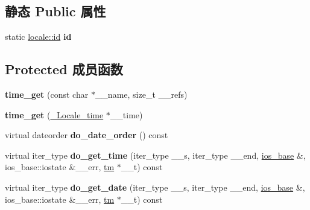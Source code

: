 \subsection*{静态 Public 属性}
\begin{DoxyCompactItemize}
\item 
\mbox{\label{classtime__get_a83e1601ae209d75feecab5f5980adb9a}} 
static \hyperlink{classlocale_1_1id}{locale\+::id} {\bfseries id}
\end{DoxyCompactItemize}
\subsection*{Protected 成员函数}
\begin{DoxyCompactItemize}
\item 
\mbox{\label{classtime__get_aa9124d311727a8236a6b44c8cb560bc7}} 
{\bfseries time\+\_\+get} (const char $\ast$\+\_\+\+\_\+name, size\+\_\+t \+\_\+\+\_\+refs)
\item 
\mbox{\label{classtime__get_a15ba7645e97f900054a2911288026577}} 
{\bfseries time\+\_\+get} (\hyperlink{struct___locale__time}{\+\_\+\+Locale\+\_\+time} $\ast$\+\_\+\+\_\+time)
\item 
\mbox{\label{classtime__get_a913b0da03322937bad71cbe296d10424}} 
virtual dateorder {\bfseries do\+\_\+date\+\_\+order} () const
\item 
\mbox{\label{classtime__get_ad6afdb913ccb1da91ff26c3f892a7ec5}} 
virtual iter\+\_\+type {\bfseries do\+\_\+get\+\_\+time} (iter\+\_\+type \+\_\+\+\_\+s, iter\+\_\+type \+\_\+\+\_\+end, \hyperlink{classios__base}{ios\+\_\+base} \&, ios\+\_\+base\+::iostate \&\+\_\+\+\_\+err, \hyperlink{structtm}{tm} $\ast$\+\_\+\+\_\+t) const
\item 
\mbox{\label{classtime__get_adfa82ecfcf6d8b65db725c5025f1d00b}} 
virtual iter\+\_\+type {\bfseries do\+\_\+get\+\_\+date} (iter\+\_\+type \+\_\+\+\_\+s, iter\+\_\+type \+\_\+\+\_\+end, \hyperlink{classios__base}{ios\+\_\+base} \&, ios\+\_\+base\+::iostate \&\+\_\+\+\_\+err, \hyperlink{structtm}{tm} $\ast$\+\_\+\+\_\+t) const
\item 
\mbox{\label{classtime__get_a371cfa438576a24c5795010121e2e56c}} 

\end{DoxyCompactItemize}
